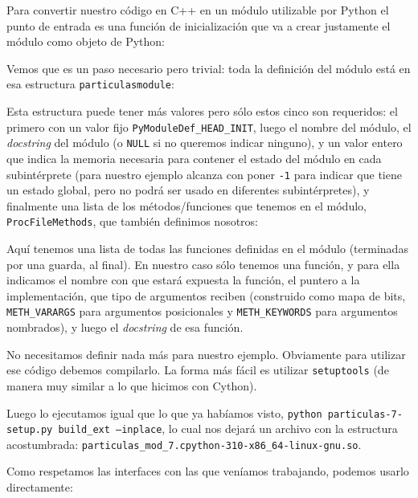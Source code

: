 Para convertir nuestro código en C++ en un módulo utilizable por Python el punto de entrada es una función de inicialización que va a crear justamente el módulo como objeto de Python:


Vemos que es un paso necesario pero trivial: toda la definición del módulo está en esa estructura \texttt{particulasmodule}:


Esta estructura puede tener más valores pero sólo estos cinco son requeridos: el primero con un valor fijo \texttt{PyModuleDef\_HEAD\_INIT}, luego el nombre del módulo, el \textit{docstring} del módulo (o \texttt{NULL} si no queremos indicar ninguno), y un valor entero que indica la memoria necesaria para contener el estado del módulo en cada subintérprete (para nuestro ejemplo alcanza con poner \texttt{-1} para indicar que tiene un estado global, pero no podrá ser usado en diferentes subintérpretes), y finalmente una lista de los métodos/funciones que tenemos en el módulo, \texttt{ProcFileMethods}, que también definimos nosotros:


Aquí tenemos una lista de todas las funciones definidas en el módulo (terminadas por una guarda, al final). En nuestro caso sólo tenemos una función, y para ella indicamos el nombre con que estará expuesta la función, el puntero a la implementación, que tipo de argumentos reciben (construido como mapa de bits, \texttt{METH\_VARARGS} para argumentos posicionales y \texttt{METH\_KEYWORDS} para argumentos nombrados), y luego el \textit{docstring} de esa función.

No necesitamos definir nada más para nuestro ejemplo. Obviamente para utilizar ese código debemos compilarlo. La forma más fácil es utilizar \texttt{setuptools} (de manera muy similar a lo que hicimos con Cython).


Luego lo ejecutamos igual que lo que ya habíamos visto, \texttt{python particulas-7-setup.py build\_ext --inplace}, lo cual nos dejará un archivo con la estructura acostumbrada: \texttt{particulas\_mod\_7.cpython-310-x86\_64-linux-gnu.so}.

Como respetamos las interfaces con las que veníamos trabajando, podemos usarlo directamente:

